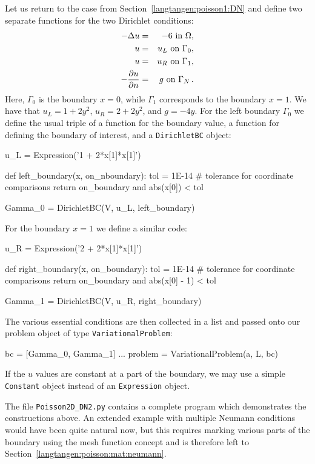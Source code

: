 Let us
return to the case from Section~\ref{langtangen:poisson1:DN}
and define two separate functions for
the two Dirichlet conditions:
\begin{eqnarray*}
    - \Delta u &=& -6 \mbox{ in } \Omega, \\
    u &=& u_L \mbox{ on } \Gamma_0, \\
    u &=& u_R \mbox{ on } \Gamma_1, \\
    - {\partial u\over\partial n} &=& g \mbox{ on } \Gamma_N \thinspace .
\end{eqnarray*}
Here, $\Gamma_0$ is the boundary $x=0$, while
$\Gamma_1$ corresponds to the boundary $x=1$.
We have that $u_L = 1 + 2y^2$, $u_R = 2 + 2y^2$, and $g=-4y$.
For the left boundary $\Gamma_0$ we
define
the usual triple of a function for the boundary value, 
a function for defining
the boundary of interest, and a {\fontsize{10pt}{10pt}\texttt{DirichletBC}} object:
\begin{python}
u_L = Expression('1 + 2*x[1]*x[1]')

def left_boundary(x, on_nboundary):
    tol = 1E-14   # tolerance for coordinate comparisons
    return on_boundary and abs(x[0]) < tol

Gamma_0 = DirichletBC(V, u_L, left_boundary)
\end{python}
For the boundary $x=1$ we define a similar code:
\begin{python}
u_R = Expression('2 + 2*x[1]*x[1]')

def right_boundary(x, on_boundary):
    tol = 1E-14   # tolerance for coordinate comparisons
    return on_boundary and abs(x[0] - 1) < tol
 
Gamma_1 = DirichletBC(V, u_R, right_boundary)
\end{python}
The various essential conditions are then collected in a list
and passed onto our problem object of type {\fontsize{10pt}{10pt}\texttt{VariationalProblem}}:
\begin{python}
bc = [Gamma_0, Gamma_1]
...
problem = VariationalProblem(a, L, bc)
\end{python}

If the $u$ values are constant at a part of the boundary, we may use
a simple {\fontsize{10pt}{10pt}\texttt{Constant}} object instead of an {\fontsize{10pt}{10pt}\texttt{Expression}} object.

The file {\fontsize{10pt}{10pt}\verb!Poisson2D_DN2.py!} contains a complete program which
demonstrates the constructions above.
An extended example with multiple Neumann conditions would have
been quite natural now, but this requires marking various parts
of the boundary using the mesh function concept and is therefore
left to Section~\ref{langtangen:poisson:mat:neumann}.


